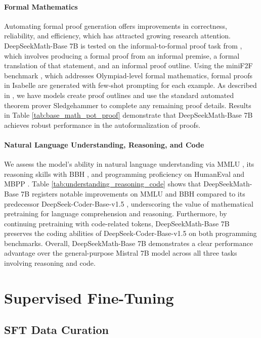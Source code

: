 \paragraph{Formal Mathematics}

Automating formal proof generation offers improvements in correctness, reliability, and efficiency, which has attracted growing research attention. DeepSeekMath-Base 7B is tested on the informal-to-formal proof task from \citep{dsp_proof}, which involves producing a formal proof from an informal premise, a formal translation of that statement, and an informal proof outline. Using the miniF2F benchmark \citep{minif2f}, which addresses Olympiad-level formal mathematics, formal proofs in Isabelle are generated with few-shot prompting for each example. As described in \cite{dsp_proof}, we have models create proof outlines and use the standard automated theorem prover Sledgehammer \citep{sledgehammer} to complete any remaining proof details. Results in Table \ref{tab:base_math_pot_proof} demonstrate that DeepSeekMath-Base 7B achieves robust performance in the autoformalization of proofs.

\paragraph{Natural Language Understanding, Reasoning, and Code}

We assess the model’s ability in natural language understanding via MMLU \citep{mmlu}, its reasoning skills with BBH \citep{bbh}, and programming proficiency on HumanEval \citep{codex} and MBPP \citep{mbpp}. Table \ref{tab:understanding_reasoning_code} shows that DeepSeekMath-Base 7B registers notable improvements on MMLU and BBH compared to its predecessor DeepSeek-Coder-Base-v1.5 \citep{deepseek-coder}, underscoring the value of mathematical pretraining for language comprehension and reasoning. Furthermore, by continuing pretraining with code-related tokens, DeepSeekMath-Base 7B preserves the coding abilities of DeepSeek-Coder-Base-v1.5 on both programming benchmarks. Overall, DeepSeekMath-Base 7B demonstrates a clear performance advantage over the general-purpose Mistral 7B model \citep{mistral} across all three tasks involving reasoning and code.

\section{Supervised Fine-Tuning}

\subsection{SFT Data Curation}

